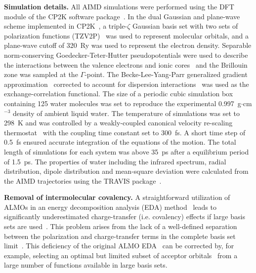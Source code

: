 \documentclass[aps,prl,reprint,amsmath,amssymb]{revtex4-1}
\begin{document}
\textbf{Simulation details.} All AIMD simulations were performed using the DFT module of the CP2K software package~\cite{www:cp2k}. 
In the dual Gaussian and plane-wave scheme implemented in CP2K~\cite{hutter2014cp2k}, a triple-$\zeta$ Gaussian basis set with two sets of polarization functions (TZV2P)~\cite{vandevondele2007gaussian} was used to represent molecular orbitals, and a plane-wave cutoff of 320~Ry was used to represent the electron density. 
Separable norm-conserving Goedecker-Teter-Hutter pseudopotentials were used to describe the interactions between the valence electrons and ionic cores~\cite{goedecker1996separable,krack2005pseudopotentials} and the Brillouin zone was sampled at the $\Gamma$-point. 
The Becke-Lee-Yang-Parr generalized gradient approximation~\cite{becke1988density, lee1988development} corrected to account for dispersion interactions~\cite{grimme2010consistent} was used as the exchange-correlation functional. 
The size of a periodic cubic simulation box containing 125 water molecules was set to reproduce the experimental 0.997~g$\cdot$cm$^{-3}$ density of ambient liquid water. 
The temperature of simulations was set to 298~K and was controlled by a weakly-coupled canonical velocity re-scaling thermostat~\cite{bussi2007canonical} with the coupling time constant set to 300~fs. 
A short time step of 0.5~fs ensured accurate integration of the equations of the motion. 
The total length of simulations for each system was above 35~ps after a equilibrium period of 1.5~ps. 
The properties of water including the infrared spectrum, radial distribution, dipole distribution and mean-square deviation were calculated from the AIMD trajectories using the TRAVIS package~\cite{brehm2012travis}.  

\textbf{Removal of intermolecular covalency.} A straightforward utilization of ALMOs in an energy decomposition analysis (EDA) method~\cite{khaliullin2007unravelling} leads to significantly underestimated charge-transfer (i.e. covalency) effects if large basis sets are used~\cite{horn2015polarization,herbert2016}. 
This problem arises from the lack of a well-defined separation between the polarization and charge-transfer terms in the complete basis set limit~\cite{misquitta2013saptdftct,horn2015polarization}. 
This deficiency of the original ALMO EDA~\cite{khaliullin2007unravelling} can be corrected by, for example, selecting an optimal but limited subset of acceptor orbitals~\cite{horn2015polarization} from a large number of functions available in large basis sets. 
\end{document}
